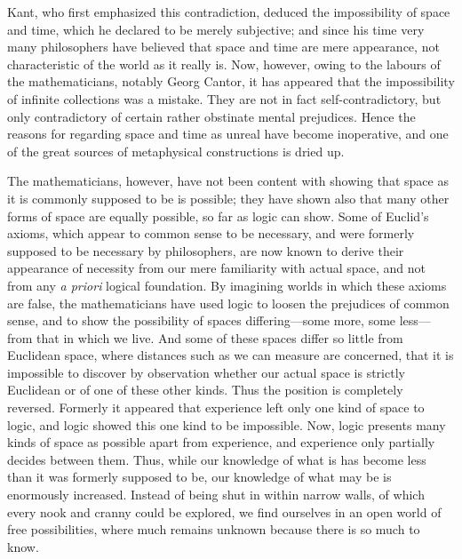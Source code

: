 \documentclass[oneside,letterpaper,12pt]{book}
\begin{document}
Kant, who first emphasized this contradiction, deduced the impossibility
of space and time, which he declared to be merely subjective; and since
his time very many philosophers have believed that space and time are
mere appearance, not characteristic of the world as it really is. Now,
however, owing to the labours of the mathematicians, notably Georg
Cantor, it has appeared that the impossibility of infinite collections
was a mistake. They are not in fact self-contradictory, but only
contradictory of certain rather obstinate mental prejudices. Hence the
reasons for regarding space and time as unreal have become inoperative,
and one of the great sources of metaphysical constructions is dried up.

The mathematicians, however, have not been content with showing that
space as it is commonly supposed to be is possible; they have shown also
that many other forms of space are equally possible, so far as logic can
show. Some of Euclid's axioms, which appear to common
sense to be necessary, and were formerly supposed to be necessary by
philosophers, are now known to derive their appearance of necessity from
our mere familiarity with actual space, and not from any \emph{a priori}
logical foundation. By imagining worlds in which these axioms are false,
the mathematicians have used logic to loosen the prejudices of common
sense, and to show the possibility of spaces differing---some more, some
less---from that in which we live. And some of these spaces differ so
little from Euclidean space, where distances such as we can measure are
concerned, that it is impossible to discover by observation whether our
actual space is strictly Euclidean or of one of these other kinds. Thus
the position is completely reversed. Formerly it appeared that
experience left only one kind of space to logic, and logic showed this
one kind to be impossible. Now, logic presents many kinds of space as
possible apart from experience, and experience only partially decides
between them. Thus, while our knowledge of what is has become less than
it was formerly supposed to be, our knowledge of what may be is
enormously increased. Instead of being shut in within narrow walls, of
which every nook and cranny could be explored, we find ourselves in an
open world of free possibilities, where much remains unknown because
there is so much to know. \label{possibilities}
\end{document}
